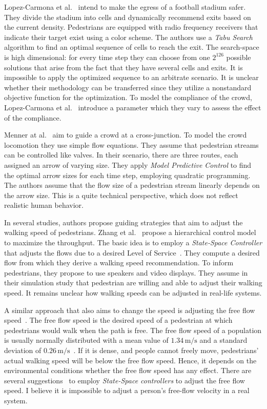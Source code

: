 % 
Lopez-Carmona et al.~\cite{lopez-2021-cdyn} intend to make the egress of a football stadium safer. They divide the stadium into cells and dynamically recommend exits based on the current density. Pedestrians are equipped with radio frequency receivers that indicate their target exist using a color scheme. The authors use a \textit{Tabu Search} algorithm to find an optimal sequence of cells to reach the exit. The search-space is high dimensional: for every time step they can choose from one $2^{126}$ possible solutions that arise from the fact that they have several cells and exits. It is impossible to apply the optimized sequence to an arbitrate scenario. It is unclear whether their methodology can be transferred since they utilize a nonstandard objective function for the optimization. To model the compliance of the crowd, Lopez-Carmona et al.~\cite{lopez-2021-cdyn} introduce a parameter which they vary to assess the effect of the compliance. 


Menner at al.~\cite{menner-2023-cdyn} aim to guide a crowd at a cross-junction. To model the crowd locomotion they use simple flow equations. They assume that pedestrian streams can be controlled like valves. In their scenario, there are three routes, each assigned an arrow of varying size. They apply \textit{Model Predictive Control} to find the optimal arrow sizes for each time step, employing quadratic programming.
The authors assume that the flow size of a pedestrian stream linearly depends on the arrow size. This is a quite technical perspective, which does not reflect realistic human behavior. 


In several studies, authors propose guiding strategies that aim to adjust the walking speed of pedestrians.
Zhang et al.~\cite{zhang-2016-cdyn} propose a hierarchical control model to maximize the throughput. The basic idea is to employ a \textit{State-Space Controller} that adjusts the flows due to a desired Level of Service~\cite{fruin-1971-cdyn}. They compute a desired flow from which they derive a walking speed recommendation. To inform pedestrians, they propose to use speakers and video displays. They assume in their simulation study that pedestrian are willing and able to adjust their walking speed. It remains unclear how walking speeds can be adjusted in real-life systems. 

A similar approach that also aims to change the speed is adjusting the free flow speed~\cite{kachroo-2010-cdyn, shende-2011-cdyn, shende-2013-cdyn}. The free flow speed is the desired speed of a pedestrian at which pedestrians would walk when the path is free. The free flow speed of a population is usually normally distributed with a mean value of $1.34\,\text{m/s}$ and a standard deviation of $0.26\,\text{m/s}$~\cite{weidmann-1994-cdyn}. If it is dense, and people cannot freely move, pedestrians' actual walking speed will be below the free flow speed. Hence, it depends on the environmental conditions whether the free flow speed has any effect. There are several suggestions~\cite{kachroo-2010-cdyn, shende-2011-cdyn, shende-2013-cdyn} to employ \textit{State-Space controllers} to adjust the free flow speed. I believe it is impossible to adjust a person's free-flow velocity in a real system. 

